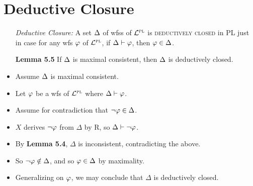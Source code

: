 \documentclass[a4paper, 11pt]{article} %
\begin{document}
\section*{Deductive Closure}%
  \label{sec:DeductiveClosue}

\begin{itemize}
  \item[\it Deductive Closure:] A set $\Delta$ of wfss of $\mathcal{L}^{\textsc{pl}}$ is \textsc{deductively closed} in PL just in case for any wfs $\varphi$ of $\mathcal{L}^{\textsc{pl}}$, if $\Delta\vdash\varphi$, then $\varphi\in\Delta$.
  \item[\bf Lemma 5.5] If $\Delta$ is maximal consistent, then $\Delta$ is deductively closed.
    \item Assume $\Delta$ is maximal consistent.
    \item Let $\varphi$ be a wfs of $\mathcal{L}^{\textsc{pl}}$ where $\Delta\vdash\varphi$.
    \item Assume for contradiction that $\neg\varphi \in \Delta$.
    \item $X$ derives $\neg\varphi$ from $\Delta$ by R, so $\Delta \vdash \neg\varphi$.
    \item By \textbf{Lemma 5.4}, $\Delta$ is inconsistent, contradicting the above.
    \item So $\neg\varphi\notin\Delta$, and so $\varphi \in \Delta$ by maximality. 
    \item Generalizing on $\varphi$, we may conclude that $\Delta$ is deductively closed. 
\end{itemize}
\end{document}
